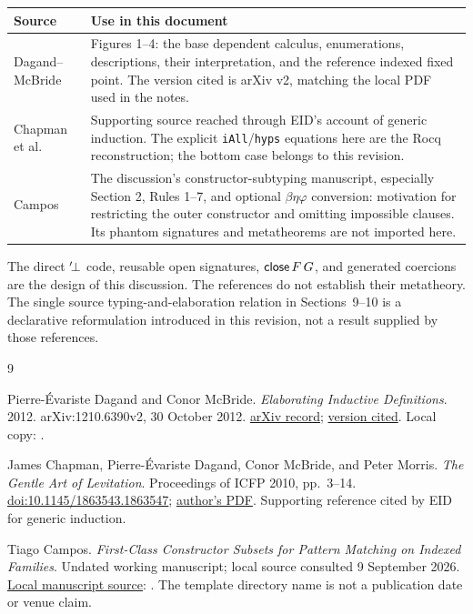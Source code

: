 \newpage
{}
\begin{center}
\begin{tabular}{@{}p{.27\linewidth}p{.67\linewidth}@{}}
\toprule
Source & Use in this document\\
\midrule
Dagand--McBride~\cite{dagand-mcbride-2012}
 & Figures 1--4: the base dependent calculus, enumerations, descriptions,
 their interpretation, and the reference indexed fixed point.
 The version cited is arXiv v2, matching the local PDF used in the notes.\\[5pt]
Chapman et al.~\cite{chapman-et-al-2010}
 & Supporting source reached through EID's account of generic induction.
 The explicit \texttt{iAll}/\texttt{hyps} equations here are the Rocq
 reconstruction; the bottom case belongs to this revision.\\[5pt]
Campos~\cite{campos-constructor-subsets}
 & The discussion's constructor-subtyping manuscript, especially
 Section 2, Rules 1--7, and optional $\beta\eta\varphi$ conversion:
 motivation for restricting the outer constructor and omitting impossible
 clauses. Its phantom signatures and metatheorems are not imported here.\\
\bottomrule
\end{tabular}
\end{center}
The direct ${}^{\prime}\!\bot$ code, reusable open signatures, $\mathsf{close}\,F\,G$,
and generated coercions are the design of this discussion. The references
do not establish their metatheory. The single source typing-and-elaboration
relation in Sections~9--10 is a declarative reformulation introduced in this
revision, not a result supplied by those references.

\begin{thebibliography}{9}
\raggedright
{}
Pierre-\'Evariste Dagand and Conor McBride.
\emph{Elaborating Inductive Definitions}.
2012. arXiv:1210.6390v2, 30 October 2012.
\href{https://arxiv.org/abs/1210.6390}{arXiv record};
\href{https://arxiv.org/pdf/1210.6390v2}{version cited}.
Local copy: .

James Chapman, Pierre-\'Evariste Dagand, Conor McBride, and Peter Morris.
\emph{The Gentle Art of Levitation}.
Proceedings of ICFP 2010, pp.~3--14.
\href{https://doi.org/10.1145/1863543.1863547}{doi:10.1145/1863543.1863547};
\href{https://jmchapman.io/papers/levitation.pdf}{author's PDF}.
Supporting reference cited by EID for generic induction.

Tiago Campos.
\emph{First-Class Constructor Subsets for Pattern Matching on Indexed Families}.
Undated working manuscript; local source consulted 9 September 2026.
\href{../../../Subtyping-Theory/subindex/LIPIcs_2021_Version_Sample/subtyping_paper.tex}
 {Local manuscript source}:
.
The template directory name is not a publication date or venue claim.
\end{thebibliography}
